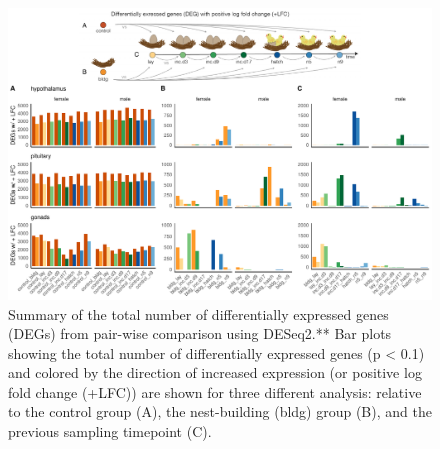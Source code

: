 \begin{figure}[h]
  \centering
  \includegraphics[width=1.0\textwidth]{../../figures/supplfig-1-1}
  \caption{Summary of the total number of differentially expressed genes (DEGs) from pair-wise comparison using DESeq2.** Bar plots showing the total number of differentially expressed genes (p < 0.1) and colored by the direction of increased expression (or positive log fold change (+LFC))  are shown for three different analysis: relative to the control group (A), the nest-building (bldg) group (B), and the previous sampling timepoint (C).}
  \label{figure:supplfig1}
\end{figure}

\newpage

